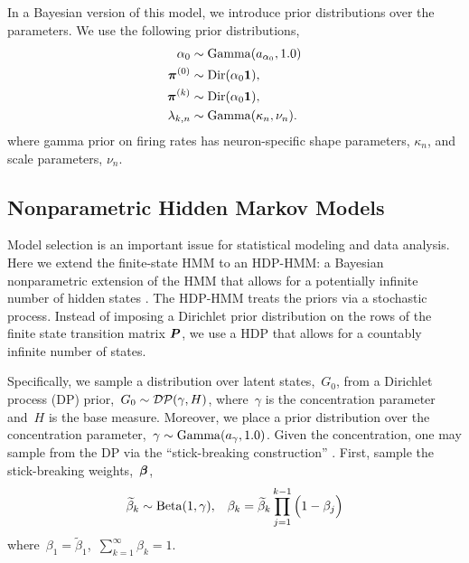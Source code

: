 
In a Bayesian version of this model,  we introduce prior distributions over
the parameters. We use the following prior distributions,
\begin{align*}
  \alpha_0 &\sim \mathrm{Gamma}(a_{\alpha_0}, 1.0) \\
  \boldsymbol{\pi}^{(0)} &\sim \mathrm{Dir}(\alpha_0\boldsymbol{1}),\\
  \boldsymbol{\pi}^{(k)} &\sim \mathrm{Dir}(\alpha_0\boldsymbol{1}), \\
  \lambda_{k,n} &\sim \mathrm{Gamma}(\kappa_n,\nu_n).
\end{align*}
where gamma prior on firing rates has neuron-specific shape parameters,
$\kappa_n$, and scale parameters, $\nu_n$.

\subsection{Nonparametric Hidden Markov Models}

Model selection is an important issue for statistical modeling and
data analysis.  Here we extend the finite-state HMM to an
HDP-HMM: a Bayesian nonparametric extension of the HMM that allows for
a potentially infinite number of hidden states \citep{Teh06,
  Beal02}. The HDP-HMM treats the priors via a stochastic
process. Instead of imposing a Dirichlet prior distribution on the
rows of the finite state transition matrix $\boldsymbol{P}$, we use a HDP that
allows for a countably infinite number of states.

Specifically, we sample a distribution over latent states,~$G_0$, from
a Dirichlet process (DP) \citep{Ferguson73}
prior,~${G_0\sim \mathcal{DP}(\gamma,H)}$, where~$\gamma$ is the
concentration parameter and~$H$ is the base measure.  Moreover, we
place a prior distribution over the concentration parameter,~$\gamma
\sim \mathrm{Gamma}(a_{\gamma}, 1.0)$.  Given the concentration, one may
sample from the DP via the ``stick-breaking construction''
\citep{Sethuraman94}. First, sample the stick-breaking
weights,~$\boldsymbol{\beta}$,
\begin{eqnarray}                                   
\widetilde{\beta}_{k}\sim \mathrm{Beta}(1,\gamma), \;\;\; \beta_{k}=\widetilde{\beta}_{k}\prod_{j=1}^{k-1}\Big(1-\beta_{j}\Big)
\label{stick1}
\end{eqnarray}
where~$\beta_1 = \widetilde{\beta}_1$,~$\sum_{k=1}^\infty \beta_{k}=1$.

